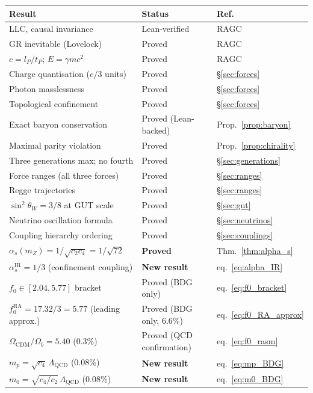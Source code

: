 \documentclass[11pt,a4paper]{article}
\begin{document}
\begin{center}
\renewcommand{\arraystretch}{1.25}
\begin{tabular}{p{5.5cm}ll}
\toprule
Result & Status & Ref. \\
\midrule
LLC, causal invariance & Lean-verified & RAGC \\
GR inevitable (Lovelock) & Proved & RAGC \\
$c = l_P/t_P$; $E = \gamma mc^2$ & Proved & RAGC \\
Charge quantisation ($e/3$ units) & Proved & \S\ref{sec:forces} \\
Photon masslessness & Proved & \S\ref{sec:forces} \\
Topological confinement & Proved & \S\ref{sec:forces} \\
Exact baryon conservation & Proved (Lean-backed) & Prop.~\ref{prop:baryon} \\
Maximal parity violation & Proved & Prop.~\ref{prop:chirality} \\
Three generations max; no fourth & Proved & \S\ref{sec:generations} \\
Force ranges (all three forces) & Proved & \S\ref{sec:ranges} \\
Regge trajectories & Proved & \S\ref{sec:ranges} \\
$\sin^2\theta_W = 3/8$ at GUT scale & Proved & \S\ref{sec:gut} \\
Neutrino oscillation formula & Proved & \S\ref{sec:neutrinos} \\
Coupling hierarchy ordering & Proved & \S\ref{sec:couplings} \\
$\alpha_s(m_Z) = 1/\sqrt{c_2 c_4} = 1/\sqrt{72}$ & \textbf{Proved} & Thm.~\ref{thm:alpha_s} \\
$\alpha_s^{\mathrm{IR}} = 1/3$ (confinement coupling) & \textbf{New result} & eq.~\eqref{eq:alpha_IR} \\
$f_0 \in [2.04, 5.77]$ bracket & Proved (BDG only) & eq.~\eqref{eq:f0_bracket} \\
$f_0^{\mathrm{RA}} = 17.32/3 = 5.77$ (leading approx.) & Proved (BDG only, $6.6\%$) & eq.~\eqref{eq:f0_RA_approx} \\
$\Omega_{\mathrm{CDM}}/\Omega_b = 5.40$ ($0.3\%$) & Proved (QCD confirmation) & eq.~\eqref{eq:f0_rasm} \\
$m_p = \sqrt{c_4}\,\Lambda_{\mathrm{QCD}}$ ($0.08\%$) & \textbf{New result} & eq.~\eqref{eq:mp_BDG} \\
$m_0 = \sqrt{c_4/c_2}\,\Lambda_{\mathrm{QCD}}$ ($0.08\%$) & \textbf{New result} & eq.~\eqref{eq:m0_BDG} \\

\end{tabular}
\end{center}
\end{document}
